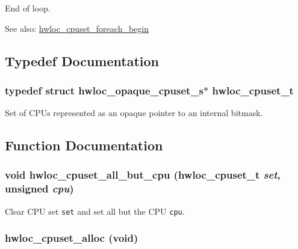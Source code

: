 End of loop. 

\begin{Desc}
\item[See also:]\hyperlink{group__hwlocality__cpuset_g8f896ce703ad1740fdf9ce8ac6361359}{hwloc\_\-cpuset\_\-foreach\_\-begin} \end{Desc}


\subsection{Typedef Documentation}
\hypertarget{group__hwlocality__cpuset_g82e51d695c430832b703dad5ab8d75e4}{
\subsubsection[{hwloc\_\-cpuset\_\-t}]{\setlength{\rightskip}{0pt plus 5cm}typedef struct hwloc\_\-opaque\_\-cpuset\_\-s$\ast$ {\bf hwloc\_\-cpuset\_\-t}}}
\label{group__hwlocality__cpuset_g82e51d695c430832b703dad5ab8d75e4}


Set of CPUs represented as an opaque pointer to an internal bitmask. 



\subsection{Function Documentation}
\hypertarget{group__hwlocality__cpuset_gddd96b6d8b7d11e0891c7416e5a68598}{
\subsubsection[{hwloc\_\-cpuset\_\-all\_\-but\_\-cpu}]{\setlength{\rightskip}{0pt plus 5cm}void hwloc\_\-cpuset\_\-all\_\-but\_\-cpu ({\bf hwloc\_\-cpuset\_\-t} {\em set}, \/  unsigned {\em cpu})}}
\label{group__hwlocality__cpuset_gddd96b6d8b7d11e0891c7416e5a68598}


Clear CPU set {\tt set} and set all but the CPU {\tt cpu}. 

\hypertarget{group__hwlocality__cpuset_g82803256c7e78369aad77a2a9e5599a2}{
\subsubsection[{hwloc\_\-cpuset\_\-alloc}]{ hwloc\_\-cpuset\_\-alloc (void)}}
\label{group__hwlocality__cpuset_g82803256c7e78369aad77a2a9e5599a2}


